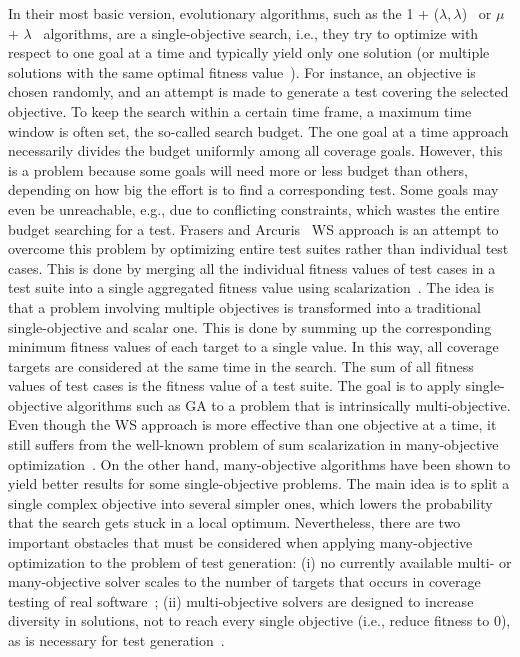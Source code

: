 \documentclass[paper=a4,%
  twoside,%
  BCOR4mm,%
  abstract=true,%
  toc=bibliography,%
  chapterprefix=true,%
  toc=bibliographynumbered,%
  open=right,%
  english,%
  pagesize=pdftex]{scrreprt}
\begin{document}
In their most basic version, evolutionary algorithms, such as the 1 + ($\lambda,\lambda$)~\cite{Doerr2015} or $\mu$ + $\lambda$~\cite{TerSarkisov2011} algorithms, are a single-objective search, i.e., they try to optimize with respect to one goal at a time and typically yield only one solution (or multiple solutions with the same optimal fitness value~\cite{Panichella2018}). For instance, an objective is chosen randomly, and an attempt is made to generate a test covering the selected objective. To keep the search within a certain time frame, a maximum time window is often set, the so-called search budget. The one goal at a time approach necessarily divides the budget uniformly among all coverage goals. However, this is a problem because some goals will need more or less budget than others, depending on how big the effort is to find a corresponding test. Some goals may even be unreachable, e.g., due to conflicting constraints, which wastes the entire budget searching for a test. Frasers and Arcuris~\cite{Fraser_2013} \ac{WS} approach is an attempt to overcome this problem by optimizing entire test suites rather than individual test cases. This is done by merging all the individual fitness values of test cases in a test suite into a single aggregated fitness value using scalarization~\cite{Deb2014}. The idea is that a problem involving multiple objectives is transformed into a traditional single-objective and scalar one. This is done by summing up the corresponding minimum fitness values of each target to a single value. In this way, all coverage targets are considered at the same time in the search. The sum of all fitness values of test cases is the fitness value of a test suite. The goal is to apply single-objective algorithms such as \ac{GA} to a problem that is intrinsically multi-objective. Even though the \ac{WS} approach is more effective than one objective at a time, it still suffers from the well-known problem of sum scalarization in many-objective optimization~\cite{Deb2014}. On the other hand, many-objective algorithms have been shown to yield better results for some single-objective problems. The main idea is to split a single complex objective into several simpler ones, which lowers the probability that the search gets stuck in a local optimum. Nevertheless, there are two important obstacles that must be considered when applying many-objective optimization to the problem of test generation: (i) no currently available multi- or many-objective solver scales to the number of targets that occurs in coverage testing of real software~\cite{Arcuri_2014}; (ii) multi-objective solvers are designed to increase diversity in solutions, not to reach every single objective (i.e., reduce fitness to 0), as is necessary for test generation~\cite{Panichella2018}. 
\end{document}
